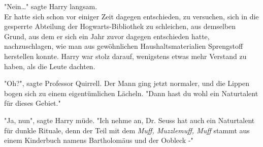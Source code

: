 {"Nein…" sagte Harry langsam.\\ Er hatte sich schon vor einiger Zeit dagegen entschieden, zu versuchen, sich in die gesperrte Abteilung der Hogwarts-Bibliothek zu schleichen, aus demselben Grund, aus dem er sich ein Jahr zuvor dagegen entschieden hatte, nachzuschlagen, wie man aus gewöhnlichen Haushaltsmaterialien Sprengstoff herstellen konnte. Harry war stolz darauf, wenigstens etwas mehr Verstand zu haben, als die Leute dachten.

"Oh?", sagte Professor Quirrell. Der Mann ging jetzt normaler, und die Lippen bogen sich zu einem eigentümlichen Lächeln. "Dann hast du wohl ein Naturtalent für dieses Gebiet."

"Ja, nun", sagte Harry müde. "Ich nehme an, Dr. Seuss hat auch ein Naturtalent für dunkle Rituale, denn der Teil mit dem \emph{Muff, Muzzlemuff, Muff} stammt aus einem Kinderbuch namens Bartholomäus und der Oobleck -"

}
